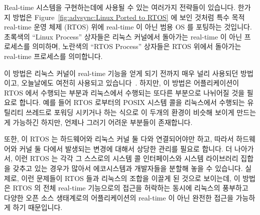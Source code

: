 Real-time 시스템을 구현하는데에 사용될 수 있는 여러가지 전략들이 있습니다.
한가지 방법은
Figure~\ref{fig:advsync:Linux Ported to RTOS} 에 보인 것처럼 특수 목적
real-time 운영 체제 (RTOS) 위에 real-time 이 아닌 범용 OS 를 포팅하는 것입니다.
초록색의 ``Linux Process'' 상자들은 리눅스 커널에서 돌아가는 real-time 이 아닌
프로세스를 의미하며, 노란색의 ``RTOS Process'' 상자들은 RTOS 위에서 돌아가는
real-time 프로세스를 의미합니다.

이 방법은 리눅스 커널이 real-time 기능을 얻게 되기 전까지 매우 널리 사용되던
방법이고, 오늘날에도 여전히 사용되고
있습니다~\cite{Xenomai2014,VictorYodaiken2004a}.
하지만, 이 방법은 어플리케이션이 RTOS 에서 수행되는 부분과 리눅스에서 수행되는
또다른 부분으로 나뉘어질 것을 필요로 합니다.
예를 들어 RTOS 로부터의 POSIX 시스템 콜을 리눅스에서 수행되는 유틸리티 쓰레드로
포워딩 시키거나 하는 식으로 이 두개의 환경이 비슷해 보이게 만드는게 가능하긴
하지만, 언제나 그러기 어려운 부분들이 존재합니다.

또한, 이 RTOS 는 하드웨어와 리눅스 커널 둘 다와 연결되어야만 하고, 따라서
하드웨어와 커널 둘 다에서 발생되는 변경에 대해서 상당한 관리를 필요로 합니다.
더 나아가서, 이런 RTOS 는 각각 그 스스로의 시스템 콜 인터페이스와 시스템
라이브러리 집합을 갖추고 있는 경우가 많아서 에코시스템과 개발자들을 분할해 놓을
수 있습니다.
실제로, 이런 문제들이 RTOS 들과 리눅스의 조합을 이끌게 된 것으로 보이는데, 이
방법은 RTOS 의 전체 real-time 기능으로의 접근을 허락하는 동시에 리눅스의
풍부하고 다양한 오픈 소스 생태계로의 어플리케이션의 real-time 이 아닌 완전한
접근을 가능하게 하기 때문입니다.
\iffalse

